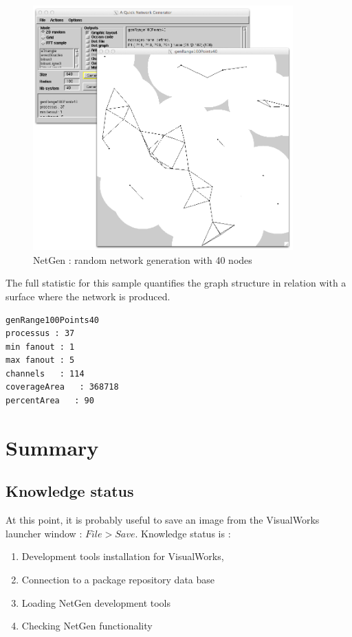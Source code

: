 \documentclass[times,a4paper]{book}
\begin{document}
\begin{figure}[hbtp]
\begin{center} 
\includegraphics[width=10cm]{netgen-commented.png}
\caption{NetGen : random network generation with 40 nodes}
\label{fig:netgen-commented}
\end{center}
\end{figure}

The full statistic for this sample quantifies the graph structure in relation with a surface
where the network is produced.

\begin{lstlisting}  
genRange100Points40
processus : 37
min fanout : 1
max fanout : 5
channels   : 114
coverageArea   : 368718
percentArea   : 90
\end{lstlisting}
\section {Summary }

\subsection{Knowledge status}
At this point, it is  probably useful to save an image from the VisualWorks launcher window : $File>Save$.
Knowledge  status is :
\begin{enumerate}
\item Development tools installation for VisualWorks,
\item Connection to a package repository data base
\item Loading NetGen development tools
\item Checking NetGen functionality
\end{enumerate}
\end{document}
